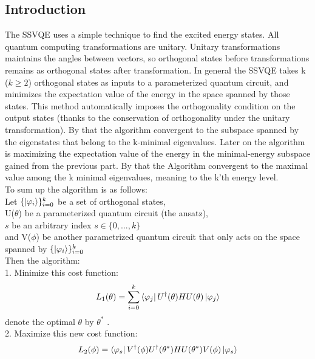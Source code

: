 \documentclass[12pt, a4paper]{article}
\begin{document}
    \subsection{Introduction}
    The SSVQE uses a simple technique to find the excited energy states.  All quantum computing transformations are unitary. Unitary transformations maintains the angles between vectors, so orthogonal states before transformations remains as orthogonal states after transformation. In general the SSVQE takes k ($k \geq 2$) orthogonal states as inputs to a parameterized quantum circuit, and minimizes the expectation value of the energy in the space spanned by those states. This method automatically imposes the orthogonality condition on the output states (thanks to the conservation of orthogonality under the unitary transformation). By that the algorithm convergent to the subspace spanned by the eigenstates that belong to the k-minimal eigenvalues. Later on the algorithm is maximizing the expectation value of the energy in the minimal-energy subspace gained from the previous part. By that the Algorithm convergent to the maximal value among the k minimal eigenvalues, meaning to the k'th energy level.\\
    To sum up the algorithm is as follows:\\
    Let $\{\ket{\varphi_i}\}_{i=0}^k$ be a set of orthogonal states,\\
    U($\theta$) be a parameterized quantum circuit (the ansatz),\\
    $s$ be an arbitrary index $s \in \{0,..., k\}$\\
    and V($\phi$) be another parametrized quantum circuit that only acts on the space spanned by
    $\{\ket{\varphi_i}\}_{i=0}^k$ \\
    Then the algorithm:\\
    1. Minimize this cost function:
    \begin{equation}
        L_1(\theta) = \sum_{i=0}^{k}{\bra{\varphi_j} U^{\dagger}(\theta) H U(\theta) \ket{\varphi_j}}
    \end{equation}
    denote the optimal $\theta$ by $\theta^*$ .\\
    2. Maximize this new cost function:
    \begin{equation}
        L_2(\phi) = \bra{\varphi_s} V^{\dagger}(\phi) U^{\dagger}(\theta^*) H U(\theta^*) V(\phi) \ket{\varphi_s}
    \end{equation}
\end{document}

